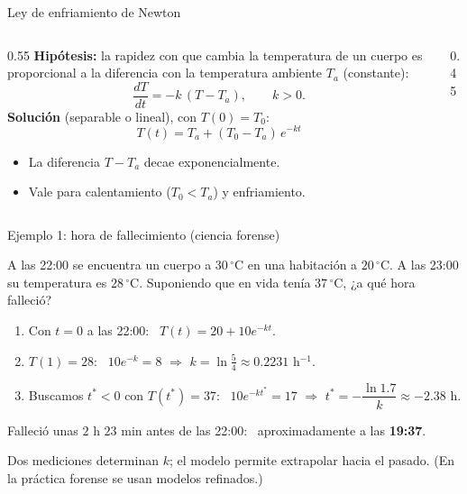 \documentclass[10pt,aspectratio=169]{beamer}
\begin{document}
\begin{frame}{Ley de enfriamiento de Newton}
  \begin{columns}
    \begin{column}{0.55\textwidth}
      \textbf{Hipótesis:} la rapidez con que cambia la temperatura de un cuerpo es proporcional a la diferencia con la temperatura
      ambiente $T_a$ (constante):
      \[ \frac{dT}{dt}=-k\,(T-T_a),\qquad k>0. \]
      \textbf{Solución} (separable o lineal), con $T(0)=T_0$:
      \[ \boxed{T(t)=T_a+(T_0-T_a)\,e^{-kt}} \]
      \begin{itemize}
        \item La diferencia $T-T_a$ decae exponencialmente.
        \item Vale para calentamiento ($T_0<T_a$) y enfriamiento.
      \end{itemize}
    \end{column}
    \begin{column}{0.45\textwidth}
      \centering
    \end{column}
  \end{columns}
\end{frame}

\begin{frame}{Ejemplo 1: hora de fallecimiento (ciencia forense)}
  \begin{ejemplo}
    A las 22:00 se encuentra un cuerpo a $30\,^\circ$C en una habitación a $20\,^\circ$C. A las 23:00 su temperatura es $28\,^\circ$C.
    Suponiendo que en vida tenía $37\,^\circ$C, ¿a qué hora falleció?
    \begin{enumerate}
      \item Con $t=0$ a las 22:00: \ $T(t)=20+10e^{-kt}$.
      \item $T(1)=28$: \ $10e^{-k}=8$ $\Rightarrow$ $k=\ln\frac54\approx0.2231$ h$^{-1}$.
      \item Buscamos $t^*<0$ con $T(t^*)=37$: \ $10e^{-kt^*}=17$ $\Rightarrow$ $t^*=-\dfrac{\ln1.7}{k}\approx-2.38$ h.
    \end{enumerate}
    Falleció unas $2$ h $23$ min antes de las 22:00: \ aproximadamente a las \textbf{19:37}.
  \end{ejemplo}
  \begin{observacion}
    Dos mediciones determinan $k$; el modelo permite extrapolar hacia el pasado. (En la práctica forense se usan modelos refinados.)
  \end{observacion}
\end{frame}
\end{document}
